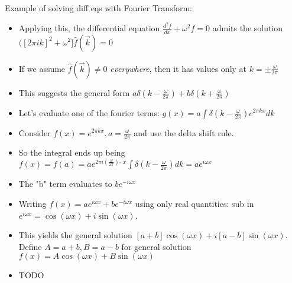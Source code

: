 \documentclass[11pt, oneside]{article}   	%
\begin{document}
Example of solving diff eqs with Fourier Transform:
\begin{itemize}
\item Applying this, the differential equation $\frac{d^2f}{dx} + \omega^2 f = 0$ admits the solution $([2\pi i k]^2 + \omega^2] \hat{f}(\vec{k}) = 0$
\item If we assume $\hat{f}(\vec{k}) \neq 0$ \emph{everywhere}, then it has values only at $k = \pm \frac{\omega}{2\pi}$
\item This suggests the general form $a \delta(k-\frac{\omega}{2\pi}) + b \delta(k+\frac{\omega}{2\pi})$
\item Let's evaluate one of the fourier terms: $g(x) =a \int \delta(k-\frac{\omega}{2\pi}) e^{2\pi k x} dk$
\item Consider $f(x) =e^{2\pi k x}, a = \frac{\omega}{2\pi}$ and use the delta shift rule.
\item So the integral ends up being $f(x) = f(a) = a e^{2\pi i (\frac{\omega}{2\pi})\cdot x}\int \delta(k-\frac{\omega}{2\pi})dk = ae^{i\omega x}$
\item The "b" term evaluates to $be^{-i \omega x}$
\item Writing $f(x) = ae^{i\omega x} + be^{-i\omega x}$ using only real quantities: sub in $e^{i\omega x} = \cos(\omega x) + i\sin(\omega x)$.
\item This yields the general solution $[a+b]\cos(\omega x) + i[a-b]\sin(\omega x).$  Define $A = a+b, B  =a-b$ for general solution $f(x) = A\cos(\omega x) + B\sin(\omega x)$
\end{itemize}




\begin{itemize}
\item TODO
\end{itemize}
\end{document}
